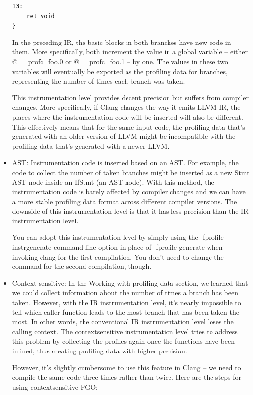\begin{itemize}
\begin{lstlisting}[style=styleCXX]
13:
	ret void
}
\end{lstlisting}

In the preceding IR, the basic blocks in both branches have new code in them. More specifically, both increment the value in a global variable – either @\_\_profc\_foo.0 or @\_\_profc\_foo.1 – by one. The values in these two variables will eventually be exported as the profiling data for branches, representing the number of times each branch was taken.

This instrumentation level provides decent precision but suffers from compiler changes. More specifically, if Clang changes the way it emits LLVM IR, the places where the instrumentation code will be inserted will also be different. This effectively means that for the same input code, the profiling data that's generated with an older version of LLVM might be incompatible with the profiling data that's generated with a newer LLVM.

\item AST: Instrumentation code is inserted based on an AST. For example, the code to collect the number of taken branches might be inserted as a new Stmt AST node inside an IfStmt (an AST node). With this method, the instrumentation code is barely affected by compiler changes and we can have a more stable profiling data format across different compiler versions. The downside of this instrumentation level is that it has less precision than the IR instrumentation level.

You can adopt this instrumentation level by simply using the -fprofile-instrgenerate command-line option in place of -fprofile-generate when invoking clang for the first compilation. You don't need to change the command for the second compilation, though.

\item Context-sensitive: In the Working with profiling data section, we learned that we could collect information about the number of times a branch has been taken. However, with the IR instrumentation level, it's nearly impossible to tell which caller function leads to the most branch that has been taken the most. In other words, the conventional IR instrumentation level loses the calling context. The contextsensitive instrumentation level tries to address this problem by collecting the profiles again once the functions have been inlined, thus creating profiling data with higher precision.

However, it's slightly cumbersome to use this feature in Clang – we need to compile the same code three times rather than twice. Here are the steps for using contextsensitive PGO:


\end{itemize}
